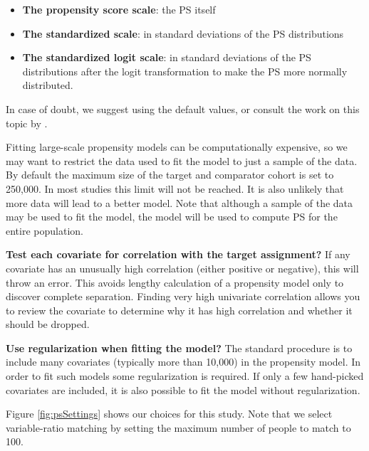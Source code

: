 \documentclass[11pt]{book}
\providecommand{\tightlist}{%
  \setlength{\itemsep}{0pt}\setlength{\parskip}{0pt}}
\theoremstyle{definition}
\theoremstyle{definition}
\theoremstyle{definition}
\theoremstyle{remark}
\begin{document}
\begin{itemize}
\tightlist
\item
  \textbf{The propensity score scale}: the PS itself
\item
  \textbf{The standardized scale}: in standard deviations of the PS distributions
\item
  \textbf{The standardized logit scale}: in standard deviations of the PS distributions after the logit transformation to make the PS more normally distributed.
\end{itemize}

In case of doubt, we suggest using the default values, or consult the work on this topic by \citet{austin_2011}.

Fitting large-scale propensity models can be computationally expensive, so we may want to restrict the data used to fit the model to just a sample of the data. By default the maximum size of the target and comparator cohort is set to 250,000. In most studies this limit will not be reached. It is also unlikely that more data will lead to a better model. Note that although a sample of the data may be used to fit the model, the model will be used to compute PS for the entire population.

\textbf{Test each covariate for correlation with the target assignment?} If any covariate has an unusually high correlation (either positive or negative), this will throw an error. This avoids lengthy calculation of a propensity model only to discover complete separation. Finding very high univariate correlation allows you to review the covariate to determine why it has high correlation and whether it should be dropped.

\textbf{Use regularization when fitting the model?} The standard procedure is to include many covariates (typically more than 10,000) in the propensity model. In order to fit such models some regularization is required. If only a few hand-picked covariates are included, it is also possible to fit the model without regularization.

Figure \ref{fig:psSettings} shows our choices for this study. Note that we select variable-ratio matching by setting the maximum number of people to match to 100.
\end{document}
